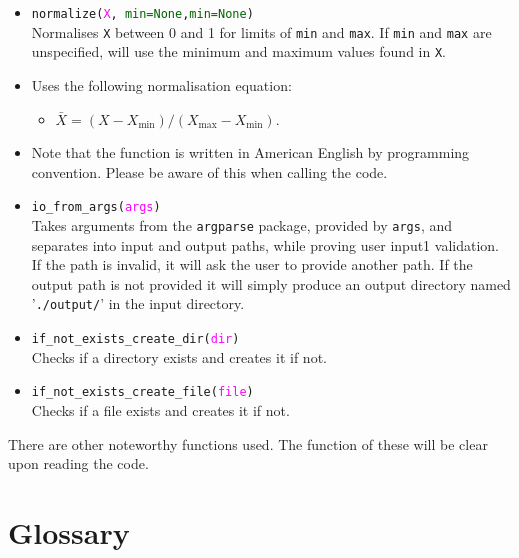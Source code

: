 \begin{itemize}
	\item \texttt{normalize(\textcolor{magenta}{X}, \textcolor{darkgreen}{min=None},\textcolor{darkgreen}{min=None})}\\
		Normalises \texttt{X} between 0 and 1 for limits of \texttt{min} and \texttt{max}. If \texttt{min} and \texttt{max} are unspecified, will use the minimum and maximum values found in \texttt{X}.
	\item[]	
		Uses the following normalisation equation:
		\begin{itemize}
			\item[] $ \bar{X} = (X - X_\text{min})/( X_\text{max} -  X_\text{min}). $
		\end{itemize}
	\item[]	Note that the function is written in American English by programming convention. Please be aware of this when calling the code.
	\item \texttt{io\_from\_args(\textcolor{magenta}{args})}\\
		Takes arguments from the \texttt{argparse} package, provided by \texttt{args}, and separates into input and output paths, while proving user input1 validation. If the path is invalid, it will ask the user to provide another path. If the output path is not provided it will simply produce an output directory named '\texttt{./output/}' in the input directory.
	\item \texttt{if\_not\_exists\_create\_dir(\textcolor{magenta}{dir})}\\
			Checks if a directory exists and creates it if not.
	\item \texttt{if\_not\_exists\_create\_file(\textcolor{magenta}{file})}\\
			Checks if a file exists and creates it if not.
\end{itemize}

There are other noteworthy functions used. The function of these will be clear upon reading the code.

\pagebreak
\section{Glossary}

